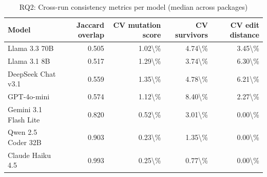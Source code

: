 \begin{table}[htbp]
\centering
{\small
\begin{tabular}{l|rrrr}
\toprule
\textbf{Model} & \textbf{Jaccard overlap} & \textbf{CV mutation score} & \textbf{CV survivors} & \textbf{CV edit distance} \\
\midrule
Llama 3.3 70B & 0.505 & 1.02\textbackslash{}\% & 4.74\textbackslash{}\% & 3.45\textbackslash{}\% \\
Llama 3.1 8B & 0.517 & 1.29\textbackslash{}\% & 3.74\textbackslash{}\% & 6.30\textbackslash{}\% \\
DeepSeek Chat v3.1 & 0.559 & 1.35\textbackslash{}\% & 4.78\textbackslash{}\% & 6.21\textbackslash{}\% \\
GPT-4o-mini & 0.574 & 1.12\textbackslash{}\% & 8.40\textbackslash{}\% & 2.27\textbackslash{}\% \\
Gemini 3.1 Flash Lite & 0.820 & 0.52\textbackslash{}\% & 3.01\textbackslash{}\% & 0.00\textbackslash{}\% \\
Qwen 2.5 Coder 32B & 0.903 & 0.23\textbackslash{}\% & 1.35\textbackslash{}\% & 0.00\textbackslash{}\% \\
Claude Haiku 4.5 & 0.993 & 0.25\textbackslash{}\% & 0.77\textbackslash{}\% & 0.00\textbackslash{}\% \\
\bottomrule
\end{tabular}
}
\caption{RQ2: Cross-run consistency metrics per model (median across packages)}
\label{tab:rq2-consistency}
\end{table}